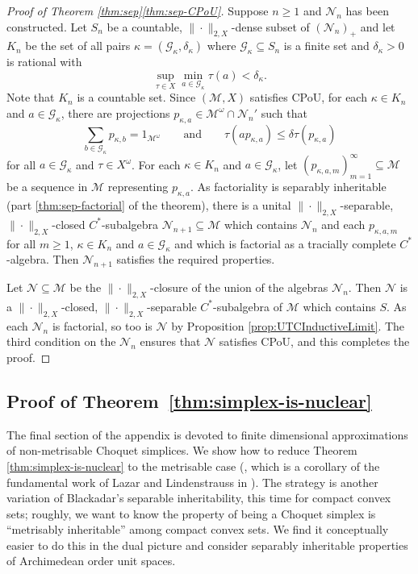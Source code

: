 \documentclass[a4paper,11pt]{amsart}
\theoremstyle{definition}
\numberwithin{equation}{section}
\numberwithin{theorem}{section}
\newcommand{\M}{\mathcal{M}}
\begin{document}
\begin{proof}[Proof of Theorem \ref{thm:sep}\ref{thm:sep-CPoU}]
	Suppose $n \geq 1$ and $\mathcal{N}_n$ has been constructed.  Let $S_n$ be a countable, $\|\cdot\|_{2, X}$-dense subset of $(\mathcal{N}_n)_+$ and let $K_n$ be the set of all pairs \mbox{$\kappa = (\mathcal G_\kappa, \delta_\kappa)$} where $\mathcal G_\kappa \subseteq S_n$ is a finite set and $\delta_\kappa > 0$ is rational with
	\begin{equation}
		\sup_{\tau \in X} \min_{a \in \mathcal G_\kappa} \tau(a) < \delta_\kappa.
	\end{equation}
	Note that $K_n$ is a countable set.  Since $(\M, X)$ satisfies CPoU, for each $\kappa \in K_n$ and $a \in \mathcal G_\kappa$, there are projections $p_{\kappa, a} \in \M^\omega \cap \mathcal{N}_n'$ such that
	\begin{equation}
		\sum_{b \in \mathcal G_\kappa} p_{\kappa, b} = 1_{\M^\omega} \qquad \text{and} \qquad \tau(a p_{\kappa, a}) \leq \delta \tau(p_{\kappa, a})
	\end{equation}
	for all $a \in \mathcal G_\kappa$ and $\tau \in X^\omega$.  For each $\kappa \in K_n$ and $a \in \mathcal G_\kappa$, let $(p_{\kappa, a, m})_{m=1}^\infty \subseteq \M$ be a sequence in $\M$ representing $p_{\kappa, a}$.  As factoriality is separably inheritable (part \ref{thm:sep-factorial} of the theorem), there is a unital $\|\cdot\|_{2, X}$-separable, $\|\cdot\|_{2, X}$-closed $C^*$-subalgebra $\mathcal{N}_{n+1} \subseteq \M$ which contains $\mathcal{N}_n$ and each $p_{\kappa, a, m}$ for all $m \geq 1$, $\kappa \in K_n$ and $a \in \mathcal G_\kappa$ and which is factorial as a tracially complete $C^*$-algebra.  Then $\mathcal{N}_{n+1}$ satisfies the required properties.


	Let $\mathcal N \subseteq \M$ be the $\|\cdot\|_{2, X}$-closure of the union of the algebras $\mathcal{N}_n$.  Then $\mathcal{N}$ is a $\|\cdot\|_{2, X}$-closed, $\|\cdot\|_{2, X}$-separable $C^*$-subalgebra of $\M$ which contains $S$. As each $\mathcal N_n$ is factorial, so too is $\mathcal N$ by Proposition \ref{prop:UTCInductiveLimit}.  The third condition on the $\mathcal N_n$ ensures that $\mathcal{N}$ satisfies CPoU, and this completes the proof.
\end{proof}

\subsection{Proof of Theorem~\ref{thm:simplex-is-nuclear}}\label{sec:sep-choquet} The final section of the appendix is devoted to finite dimensional approximations of non-metrisable Choquet simplices. We show how to reduce Theorem \ref{thm:simplex-is-nuclear} to the metrisable case (\cite[Lemma~2.8]{Elliott-Niu15}, which is a corollary of the fundamental work of Lazar and Lindenstrauss in \cite{Lazar-Lindenstrauss71}).  The strategy is another variation of Blackadar's separable inheritability, this time for compact convex sets; roughly, we want to know the property of being a Choquet simplex is ``metrisably inheritable'' among compact convex sets.  We find it conceptually easier to do this in the dual picture and consider separably inheritable properties of Archimedean order unit spaces.
\end{document}

